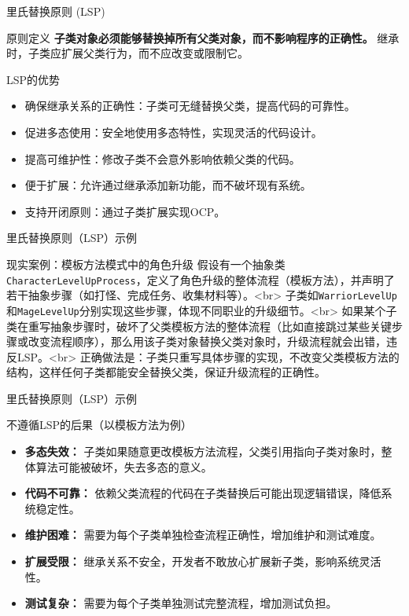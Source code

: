 \documentclass[UTF8,aspectratio=169]{beamer}
\begin{document}
\begin{frame}{里氏替换原则 (LSP)}
    \begin{ytublock}{原则定义}
        \textbf{子类对象必须能够替换掉所有父类对象，而不影响程序的正确性。}
        继承时，子类应扩展父类行为，而不应改变或限制它。
    \end{ytublock}
    \begin{ytublock}{LSP的优势}
        \begin{itemize}
            \item 确保继承关系的正确性：子类可无缝替换父类，提高代码的可靠性。
            \item 促进多态使用：安全地使用多态特性，实现灵活的代码设计。
            \item 提高可维护性：修改子类不会意外影响依赖父类的代码。
            \item 便于扩展：允许通过继承添加新功能，而不破坏现有系统。
            \item 支持开闭原则：通过子类扩展实现OCP。
        \end{itemize}
    \end{ytublock}
\end{frame}

\begin{frame}{里氏替换原则（LSP）示例}
    \begin{exampleytublock}{现实案例：模板方法模式中的角色升级}
        假设有一个抽象类\texttt{CharacterLevelUpProcess}，定义了角色升级的整体流程（模板方法），并声明了若干抽象步骤（如打怪、完成任务、收集材料等）。<br>
        子类如\texttt{WarriorLevelUp}和\texttt{MageLevelUp}分别实现这些步骤，体现不同职业的升级细节。<br>
        如果某个子类在重写抽象步骤时，破坏了父类模板方法的整体流程（比如直接跳过某些关键步骤或改变流程顺序），那么用该子类对象替换父类对象时，升级流程就会出错，违反LSP。<br>
        正确做法是：子类只重写具体步骤的实现，不改变父类模板方法的结构，这样任何子类都能安全替换父类，保证升级流程的正确性。
    \end{exampleytublock}
\end{frame}

\begin{frame}{里氏替换原则（LSP）示例}
    \begin{alertytublock}{不遵循LSP的后果（以模板方法为例）}
        \begin{itemize}
            \item \textbf{多态失效：} 子类如果随意更改模板方法流程，父类引用指向子类对象时，整体算法可能被破坏，失去多态的意义。
            \item \textbf{代码不可靠：} 依赖父类流程的代码在子类替换后可能出现逻辑错误，降低系统稳定性。
            \item \textbf{维护困难：} 需要为每个子类单独检查流程正确性，增加维护和测试难度。
            \item \textbf{扩展受限：} 继承关系不安全，开发者不敢放心扩展新子类，影响系统灵活性。
            \item \textbf{测试复杂：} 需要为每个子类单独测试完整流程，增加测试负担。
        \end{itemize}
    \end{alertytublock}
\end{frame}
\end{document}
